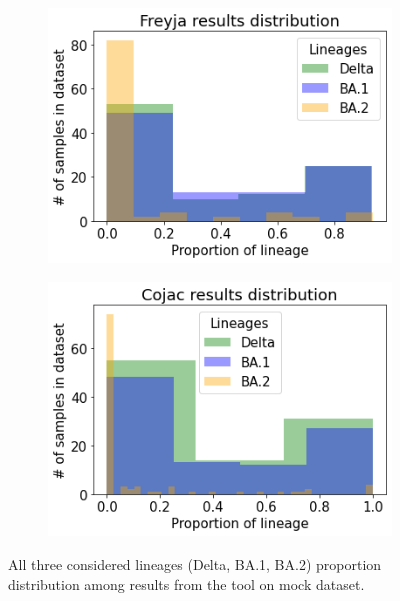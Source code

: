         \begin{figure}[H]
            \centering
            \begin{subfigure}[b]{0.45\textwidth}
            \includegraphics[width=1\textwidth]{figures/results/mock/distr-freyja.png}
            \label{fig:results:mock:dist-freyja-all}
            \end{subfigure}
            \hfill
            \begin{subfigure}[b]{0.45\textwidth}
            \includegraphics[width=1\textwidth]{figures/results/mock/distr-cojac.png}
            \label{fig:results:mock:dist-cojac-all}
            \end{subfigure}
            \caption{All three considered lineages (Delta, BA.1, BA.2) proportion distribution among results from the tool on mock dataset.}
        \end{figure}
         
